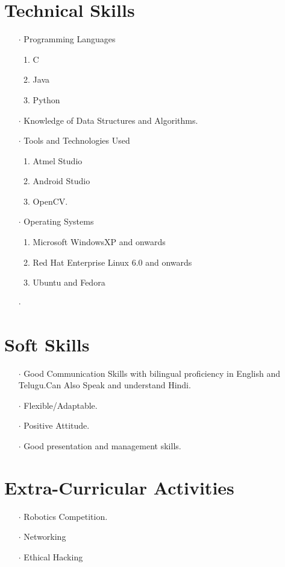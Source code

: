\documentclass[12pt]{article}
\begin{document}
\section*{Technical Skills}
\begin{itemize}
\item[$\cdot$]Programming Languages
\begin{enumerate}
\item C
\item Java
\item Python
\end{enumerate}
\item[$\cdot$]Knowledge of Data Structures and Algorithms.
\item[$\cdot$]Tools and Technologies Used
\begin{enumerate}
\item Atmel Studio
\item Android Studio
\item OpenCV.
\end{enumerate}
\item[$\cdot$]Operating Systems
\begin{enumerate}
\item Microsoft WindowsXP and onwards
\item Red Hat Enterprise Linux 6.0 and onwards
\item Ubuntu and Fedora
\end{enumerate}
\end{itemize}
\begin{itemize}
\item[$\cdot$]
\end{itemize}
\section*{Soft Skills}
\begin{itemize}
\item[$\cdot$] Good Communication Skills with bilingual proficiency in English and Telugu.Can Also Speak and understand Hindi.
\item[$\cdot$]Flexible/Adaptable.
\item[$\cdot$]Positive Attitude.
\item[$\cdot$]Good presentation and management skills.
\end{itemize}
\section*{Extra-Curricular Activities}
\begin{itemize}
\item[$\cdot$]Robotics Competition.
\item[$\cdot$]Networking
\item[$\cdot$]Ethical Hacking
\end{itemize}
\end{document}
